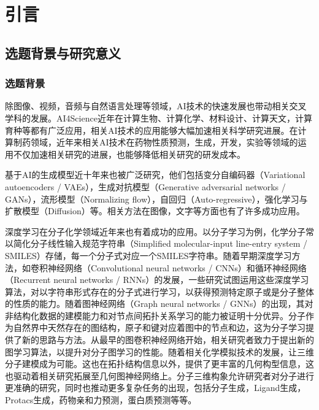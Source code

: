 \mainmatter
\fancyfoot[EC,OC]{\hspace*{1 em}\thepage{}\hspace*{1 em}}
\normalsize
{}
\chapter[引言]{引言}\fancyhead[C]{\xiaowuhao} %
\section{选题背景与研究意义}
\subsection{选题背景}
除图像、视频，音频与自然语言处理等领域，AI技术的快速发展也带动相关交叉学科的发展。AI4Science近年在计算生物、计算化学、材料设计、计算天文，计算育种等都有广泛应用，相关AI技术的应用能够大幅加速相关科学研究进展。在计算制药领域，近年来相关AI技术在药物性质预测，生成，开发，实验等领域的运用不仅加速相关研究的进展，也能够降低相关研究的研发成本。

基于AI的生成模型近十年来也被广泛研究，他们包括变分自编码器（Variational autoencoders / VAEs）\cite{vae_kingma_13}，生成对抗模型（Generative adversarial networks / GANs）\cite{gan_goodfellow_14}，流形模型（Normalizing flow）\cite{nice_dinh_15,density_dinh_17}，自回归（Auto-regressive）\cite{ar_oord_16}，强化学习与扩散模型（Diffusion）\cite{deepunsupervised_dickstein_15,generative_song_19}等。相关方法在图像，文字等方面也有了许多成功应用。

深度学习在分子化学领域近年来也有着成功的应用。以分子学习为例，化学分子常以简化分子线性输入规范字符串（Simplified molecular-input line-entry system / SMILES）\cite{smiles_weinberger_88}存储，每一个分子式对应一个SMILES字符串。随着早期深度学习方法，如卷积神经网络（Convolutional neural networks / CNNs）\cite{cnnsmiles_hirohara_18}和循环神经网络（Recurrent neural networks / RNNs）\cite{rnnsmiles_bjerrum_17,practicalmodel_liu_19,deeppurpose_huang_20}的发展，一些研究试图运用这些深度学习算法，对以字符串形式存在的分子式进行学习，以获得预测特定原子或是分子整体的性质的能力。随着图神经网络（Graph neural networks / GNNs）\cite{semisupervised_kipf_17,inductive_hamilton_17,howpowerful_xu_18}的出现，其对非结构化数据的建模能力和对节点间拓扑关系学习的能力被证明十分优异。分子作为自然界中天然存在的图结构，原子和键对应着图中的节点和边，这为分子学习提供了新的思路与方法。从最早的图卷积神经网络开始，相关研究者致力于提出新的图学习算法，以提升对分子图学习的性能。随着相关化学模拟技术的发展，让三维分子建模成为可能。这也在拓扑结构信息以外，提供了更丰富的几何构型信息，这也驱动着相关研究拓展至几何图神经网络上。分子三维构象允许研究者对分子进行更准确的研究，同时也推动更多复杂任务的出现，包括分子生成，Ligand生成，Protacs生成，药物亲和力预测，蛋白质预测等等。

